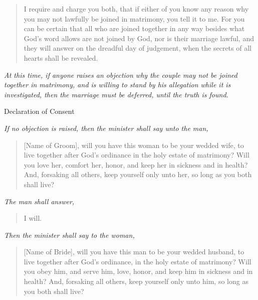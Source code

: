 \documentclass[
]{book}
\begin{document}
\begin{quote}
I require and charge you both, that if either of you know any reason why you may not lawfully be joined in matrimony, you tell it to me. For you can be certain that all who are joined together in any way besides what God's word allows are not joined by God, nor is their marriage lawful, and they will answer on the dreadful day of judgement, when the secrets of all hearts shall be revealed.
\end{quote}

\begin{center}
\emph{At this time, if anyone raises an objection why the couple may not be joined together in matrimony, and is willing to stand by his allegation while it is investigated, then the marriage must be deferred, until the truth is found.}

\end{center}

Declaration of Consent

\begin{center}
\emph{If no objection is raised, then the minister shall say unto the man,}

\end{center}

\begin{quote}
{[}Name of Groom{]}, will you have this woman to be your wedded wife, to live together after God's ordinance in the holy estate of matrimony? Will you love her, comfort her, honor, and keep her in sickness and in health? And, forsaking all others, keep yourself only unto her, so long as you both shall live?
\end{quote}

\begin{center}
\emph{The man shall answer,}

\end{center}

\begin{quote}
I will.
\end{quote}

\begin{center}
\emph{Then the minister shall say to the woman,}

\end{center}

\begin{quote}
{[}Name of Bride{]}, will you have this man to be your wedded husband, to live together after God's ordinance, in the holy estate of matrimony? Will you obey him, and serve him, love, honor, and keep him in sickness and in health? And, forsaking all others, keep yourself only unto him, so long as you both shall live?
\end{quote}
\end{document}

